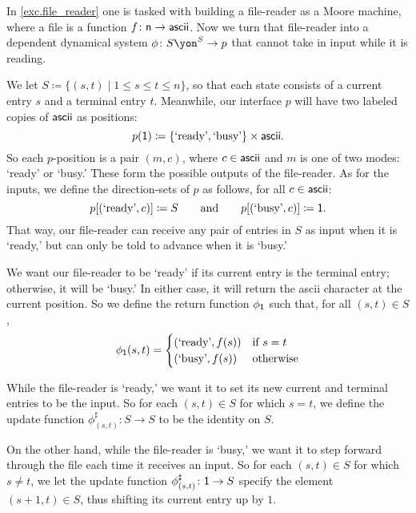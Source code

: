 \documentclass[Book-Poly]{subfiles}
\begin{document}
\begin{example}\label{ex.generalized_file_reader}
In \cref{exc.file_reader} one is tasked with building a file-reader as a Moore machine, where a file is a function $f\colon\mathsf{n}\to\mathsf{ascii}$. 
Now we turn that file-reader into a dependent dynamical system $\phi\colon S\yon^S\to p$ that cannot take in input while it is reading.

We let $S \coloneqq \{(s,t)\mid 1\leq s\leq t\leq n\}$, so that each state consists of a current entry $s$ and a terminal entry $t$.
Meanwhile, our interface $p$ will have two labeled copies of $\mathsf{ascii}$ as positions:
\[
    p(\textsf{1})\coloneqq\{\text{`ready'}, \text{`busy'}\}\times\mathsf{ascii}.
\]
So each $p$-position is a pair $(m,c)$, where $c\in\mathsf{ascii}$ and $m$ is one of two modes: `ready' or `busy.'
These form the possible outputs of the file-reader.
As for the inputs, we define the direction-sets of $p$ as follows, for all $c\in\mathsf{ascii}$:
\[
    p[(\text{`ready'}, c)]\coloneqq S \qquad\text{and}\qquad p[(\text{`busy'}, c)]\coloneqq\textsf{1}.
\]
That way, our file-reader can receive any pair of entries in $S$ as input when it is `ready,' but can only be told to advance when it is `busy.'

We want our file-reader to be `ready' if its current entry is the terminal entry; otherwise, it will be `busy.'
In either case, it will return the ascii character at the current position.
So we define the return function $\phi_{\textsf{1}}$ such that, for all $(s,t)\in S$,
\begin{align*}
  \phi_{\textsf{1}}(s, t) =
  \begin{cases}
    (\text{`ready'}, f(s)) &\mbox{if $s = t$}\\
    (\text{`busy'}, f(s)) &\mbox{otherwise}  
  \end{cases}
\end{align*}

While the file-reader is `ready,' we want it to set its new current and terminal entries to be the input.
So for each $(s,t)\in S$ for which $s=t$, we define the update function $\phi^\sharp_{(s,t)}\colon S\to S$ to be the identity on $S$.

On the other hand, while the file-reader is `busy,' we want it to step forward through the file each time it receives an input.
So for each $(s,t)\in S$ for which $s\neq t$, we let the update function $\phi^\sharp_{(s,t)}\colon \textsf{1}\to S$ specify the element $(s+1, t)\in S$, thus shifting its current entry up by $1$.
\end{example}
\end{document}
